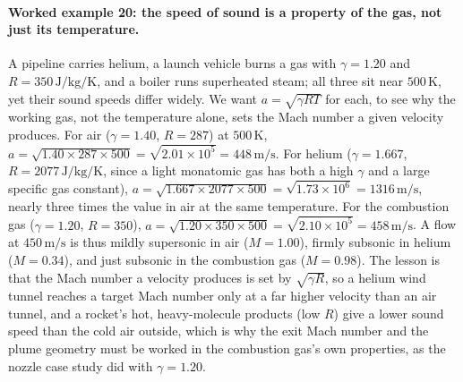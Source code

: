 \paragraph{Worked example 20: the speed of sound is a property of the
gas, not just its temperature.} A pipeline carries helium, a launch
vehicle burns a gas with $\gamma = 1.20$ and $R = 350\,\si{\joule\per
\kilogram\per\kelvin}$, and a boiler runs superheated steam; all three
sit near $500\,\si{\kelvin}$, yet their sound speeds differ widely. We
want $a = \sqrt{\gamma R T}$ for each, to see why the working gas, not
the temperature alone, sets the Mach number a given velocity produces.
For air ($\gamma = 1.40$, $R = 287$) at $500\,\si{\kelvin}$,
$a = \sqrt{1.40\times 287\times 500} = \sqrt{2.01\times 10^{5}} =
448\,\si{\meter\per\second}$. For helium ($\gamma = 1.667$,
$R = 2077\,\si{\joule\per\kilogram\per\kelvin}$, since a light monatomic
gas has both a high $\gamma$ and a large specific gas constant),
$a = \sqrt{1.667\times 2077\times 500} = \sqrt{1.73\times 10^{6}} =
1316\,\si{\meter\per\second}$, nearly three times the value in air at
the same temperature. For the combustion gas ($\gamma = 1.20$,
$R = 350$), $a = \sqrt{1.20\times 350\times 500} = \sqrt{2.10\times
10^{5}} = 458\,\si{\meter\per\second}$. A flow at
$450\,\si{\meter\per\second}$ is thus mildly supersonic in air
($M = 1.00$), firmly subsonic in helium ($M = 0.34$), and just subsonic
in the combustion gas ($M = 0.98$). The lesson is that the Mach number a
velocity produces is set by $\sqrt{\gamma R}$, so a helium wind tunnel
reaches a target Mach number only at a far higher velocity than an air
tunnel, and a rocket's hot, heavy-molecule products (low $R$) give a
lower sound speed than the cold air outside, which is why the exit Mach
number and the plume geometry must be worked in the combustion gas's
own properties, as the nozzle case study did with $\gamma = 1.20$.

